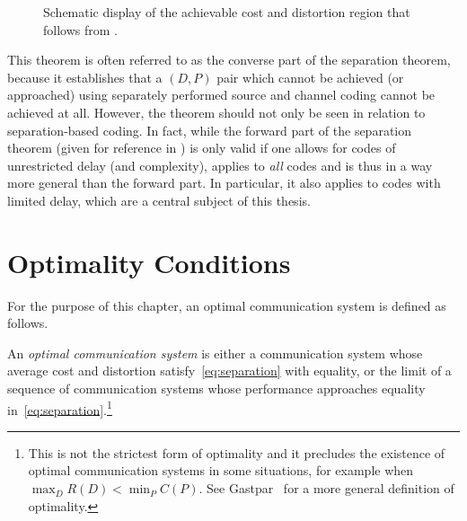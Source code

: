 \begin{figure}
  \begin{center}
  \end{center}
  \caption{Schematic display of the achievable cost and distortion region that
  follows from .}
  \label{fig:achievableregion}
\end{figure}

This theorem is often referred to as the converse part of the separation
theorem, because it establishes that a $(D,P)$ pair which cannot be achieved (or
approached) using separately performed source and channel coding cannot be
achieved at all. However, the theorem should not only be seen in relation to
separation-based coding.  In fact, while the forward part of the
separation theorem (given for reference in ) is only
valid if one allows for codes of unrestricted delay (and complexity),
 applies to \emph{all} codes and is thus in a way
more general than the forward part. In particular, it also applies to codes with
limited delay, which are a central subject of this thesis.


\section{Optimality Conditions}\label{sec:optimality}

For the purpose of this chapter, an optimal communication system is
defined as follows.

\begin{definition}
  \label{def:optimality}
  An \emph{optimal communication system} is either a communication system whose
  average cost and distortion satisfy~\eqref{eq:separation} with equality, or
  the limit of a sequence of communication systems whose performance approaches
  equality in~\eqref{eq:separation}.\footnote{This is not the strictest form of
  optimality and it precludes the existence of optimal communication systems in
  some situations, for example when $\max_D R(D) < \min_P C(P)$. See
  Gastpar~\cite{GastparThesis} for a more general  definition of optimality.}
\end{definition}

